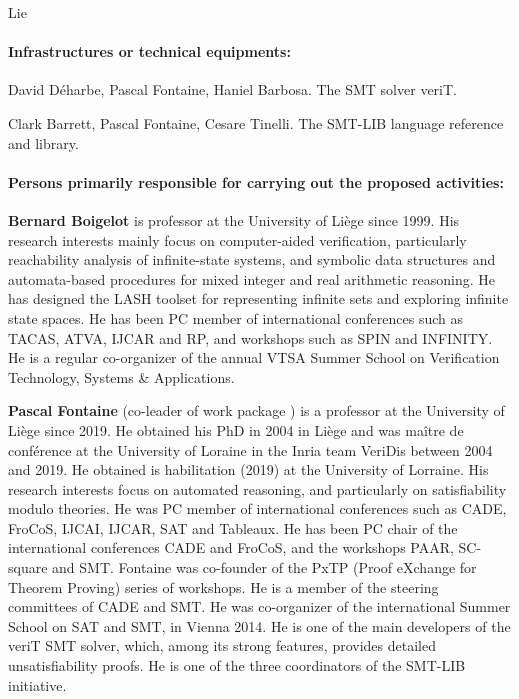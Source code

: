 \begin{sitedescription}{Lie}
\paragraph*{Infrastructures or technical equipments:}


\begin{compactitem}
\item David Déharbe, Pascal Fontaine, Haniel Barbosa.  The SMT solver veriT.
\item Clark Barrett, Pascal Fontaine, Cesare Tinelli. The SMT-LIB language reference and library.
\end{compactitem}

\paragraph*{Persons primarily responsible for carrying out the proposed activities:}

\begin{compactitem}
\item{\bf Bernard Boigelot} is professor at the University of Liège
  since 1999.  His research interests mainly focus on computer-aided
  verification, particularly reachability analysis of infinite-state
  systems, and symbolic data structures and automata-based procedures
  for mixed integer and real arithmetic reasoning.  He has designed
  the LASH toolset for representing infinite sets and exploring
  infinite state spaces. He has been PC member of international
  conferences such as TACAS, ATVA, IJCAR and RP, and workshops such as
  SPIN and INFINITY. He is a regular co-organizer of the annual VTSA
  Summer School on Verification Technology, Systems \& Applications.

\item{\bf Pascal Fontaine} (co-leader of work package ) is a
  professor at the University of Liège since 2019.  He obtained his PhD in 2004
  in Liège and was maître de conférence at the University of Loraine in the
  Inria team VeriDis between 2004 and 2019.  He obtained is habilitation (2019)
  at the University of Lorraine.  His research interests focus on automated
  reasoning, and particularly on satisfiability modulo theories.  He was PC
  member of international conferences such as CADE, FroCoS, IJCAI, IJCAR, SAT
  and Tableaux.  He has been PC chair of the international conferences CADE and
  FroCoS, and the workshops PAAR, SC-square and SMT.  Fontaine was co-founder of
  the PxTP (Proof eXchange for Theorem Proving) series of workshops.  He is a
  member of the steering committees of CADE and SMT.  He was co-organizer of the
  international Summer School on SAT and SMT, in Vienna 2014.  He is one of the
  main developers of the veriT SMT solver, which, among its strong features,
  provides detailed unsatisfiability proofs.  He is one of the three
  coordinators of the SMT-LIB initiative.
\end{compactitem}

\end{sitedescription}

